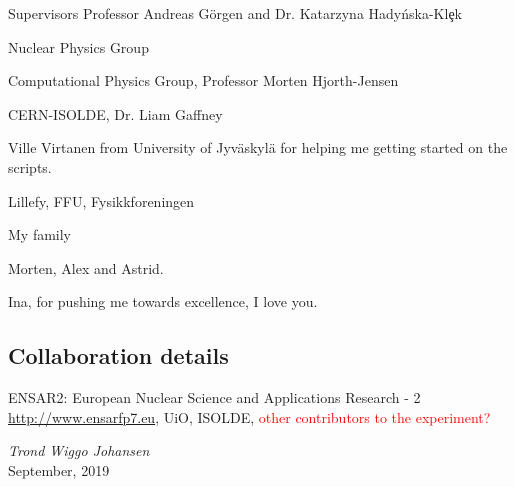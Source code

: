 \documentclass[twoside,english]{uiofysmaster/uiofysmaster}
\begin{document}
\begin{acknowledgements}
Supervisors Professor Andreas Görgen and Dr. Katarzyna Hady{\'{n}}ska-Kl{\c{e}}k

Nuclear Physics Group

Computational Physics Group, Professor Morten Hjorth-Jensen

CERN-ISOLDE, Dr. Liam Gaffney

Ville Virtanen from University of Jyväskylä for helping me getting started on the scripts. 

Lillefy, FFU, Fysikkforeningen

My family

Morten, Alex and Astrid.

Ina, for pushing me towards excellence, I love you.

\subsection*{Collaboration details}


ENSAR2: European Nuclear Science and Applications Research - 2 \url{http://www.ensarfp7.eu}, UiO, ISOLDE, \textcolor{red}{other contributors to the experiment?}



  \vspace{1.5cm}
  
  \noindent\textit{Trond Wiggo Johansen}\\
  
  \noindent September, 2019


\vspace{1cm}


\end{acknowledgements}
\end{document}
